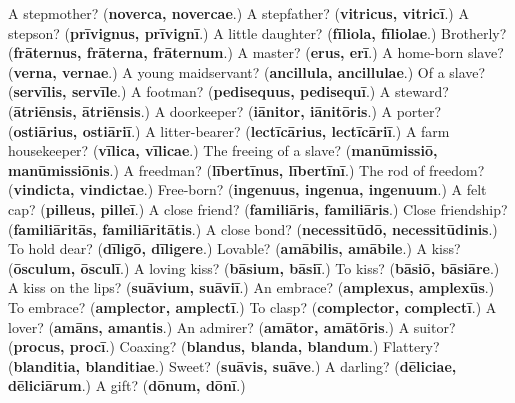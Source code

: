 \begin{tcolorbox}[breakable,colback=teal!4,colframe=teal!35!black,title={Before you move on}]
A stepmother? (\textbf{noverca, novercae}.) A stepfather? (\textbf{vitricus, vitricī}.) A stepson? (\textbf{prīvignus, prīvignī}.) A little daughter? (\textbf{fīliola, fīliolae}.) Brotherly? (\textbf{frāternus, frāterna, frāternum}.) A master? (\textbf{erus, erī}.) A home-born slave? (\textbf{verna, vernae}.) A young maidservant? (\textbf{ancillula, ancillulae}.) Of a slave? (\textbf{servīlis, servīle}.) A footman? (\textbf{pedisequus, pedisequī}.) A steward? (\textbf{ātriēnsis, ātriēnsis}.) A doorkeeper? (\textbf{iānitor, iānitōris}.) A porter? (\textbf{ostiārius, ostiāriī}.) A litter-bearer? (\textbf{lectīcārius, lectīcāriī}.) A farm housekeeper? (\textbf{vīlica, vīlicae}.) The freeing of a slave? (\textbf{manūmissiō, manūmissiōnis}.) A freedman? (\textbf{lībertīnus, lībertīnī}.) The rod of freedom? (\textbf{vindicta, vindictae}.) Free-born? (\textbf{ingenuus, ingenua, ingenuum}.) A felt cap? (\textbf{pilleus, pilleī}.) A close friend? (\textbf{familiāris, familiāris}.) Close friendship? (\textbf{familiāritās, familiāritātis}.) A close bond? (\textbf{necessitūdō, necessitūdinis}.) To hold dear? (\textbf{dīligō, dīligere}.) Lovable? (\textbf{amābilis, amābile}.) A kiss? (\textbf{ōsculum, ōsculī}.) A loving kiss? (\textbf{bāsium, bāsiī}.) To kiss? (\textbf{bāsiō, bāsiāre}.) A kiss on the lips? (\textbf{suāvium, suāviī}.) An embrace? (\textbf{amplexus, amplexūs}.) To embrace? (\textbf{amplector, amplectī}.) To clasp? (\textbf{complector, complectī}.) A lover? (\textbf{amāns, amantis}.) An admirer? (\textbf{amātor, amātōris}.) A suitor? (\textbf{procus, procī}.) Coaxing? (\textbf{blandus, blanda, blandum}.) Flattery? (\textbf{blanditia, blanditiae}.) Sweet? (\textbf{suāvis, suāve}.) A darling? (\textbf{dēliciae, dēliciārum}.) A gift? (\textbf{dōnum, dōnī}.)
\end{tcolorbox}
